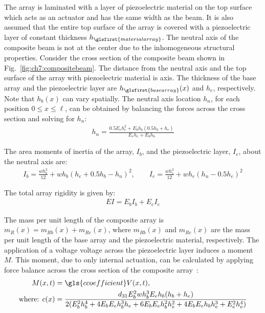 The array is laminated with a layer of piezoelectric material on the top surface which acts as an actuator and has the same width as the beam. It is also assumed that the entire top surface of the array is covered with a piezoelectric layer of constant thickness $h_{\glsfirst{materialarray}}$. The neutral axis of the composite beam is not at the center due to the inhomogeneous structural properties. Consider the cross section of the composite beam shown in Fig.~\ref{fig:ch7:compositebeam}. The distance from the neutral axis and the top surface of the array with piezoelectric material is \gls{axis}. The thickness of the base array and the piezoelectric layer are $h_{\glsfirst{basearray}}(x)$ and $h_{e}$, respectively. Note that $h_{b}(x)$ can vary spatially. The neutral axis location $h_n$, for each position $0\leq x \leq \ell$, can be obtained by balancing the forces across the cross section and solving for $h_n$:
\begin{align}
h_n = \frac{0.5 E_{e} h_{e}^{2} + E_{b} h_{b} \left(0.5 h_{b} + h_{e}\right)}{E_{e}h_{e}+E_{b}h_{b}}
\end{align}



\noindent The area moments of inertia of the array, $I_{b}$, and the piezoelectric layer, $I_{e}$, about the neutral axis are:
\begin{align}
I_{b} = \frac{w h_{b}^{3}}{12}  + w h_{b} \left(h_{e} + 0.5 h_{b} - h_n \right)^{2}, \qquad I_{e} = \frac{w h_{e}^{3}}{12} + w h_{e} \left(h_n  - 0.5 h_{e}\right)^{2} 
\end{align}

\noindent The total array rigidity is given by:
\begin{align}
EI = E_{b}I_{b} + E_{e}I_{e}
\end{align}

\noindent The mass per unit length of the composite array is $m_{R}(x) = m_{Rb}(x) + m_{Re}(x)$, where $m_{Rb}(x)$ and $m_{Re}(x)$ are the mass per unit length of the base array and the piezoelectric material, respectively. The application of a voltage \gls{voltage} across the piezoelectric layer induces a moment $M$. This moment, due to only internal actuation, can be calculated by applying force balance across the cross section of the composite array~\cite{Nakka2016a}:
\begin{align}
M(x,t) &= \gls{ccoefficient} V(x,t), \label{actuator_response}\\
\text{where: } c(x) &= \frac{d_{31} E_{b}^{2} w h_{b}^3 E_{e}  h_{b} (h_{b}+h_{e}) }{2 (E_{b}^2h_{b}^4 + 4E_{b}E_{e}h_{b}^3h_{e} + 6E_{b}E_{e}h_{b}^2h_{e}^2 + 4E_{b}E_{e}h_{b}h_{e}^3 + E_{e}^2h_{e}^4)} \notag
\end{align}

